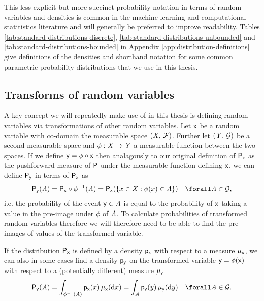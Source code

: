 This less explicit but more succinct probability notation in terms of random variables and densities is common in the machine learning and computational statitistics literature and will generally be preferred to improve readability. 
Tables \ref{tab:standard-distributions-discrete}, \ref{tab:standard-distributions-unbounded} and \ref{tab:standard-distributions-bounded} in Appendix \ref{app:distribution-definitions} give definitions of the densities and shorthand notation for some common parametric probability distributions that we use in this thesis.

\subsection{Transforms of random variables}\label{subsec:change-of-variables}

A key concept we will repeatedly make use of in this thesis is defining random variables via transformations of other random variables. Let $\mathsf{x}$ be a random variable with co-domain the measurable space $(\mathit{X},\,\mathcal{F})$. Further let $(\mathit{Y},\,\mathcal{G})$ be a second measurable space and $\phi : \mathit{X} \to \mathit{Y}$ a measurable function between the two spaces. If we define $\mathsf{y} = \phi \circ \mathsf{x}$ then analagously to our original definition of $\mathsf{P}_{\mathsf{x}}$ as the pushforward measure of $\mathsf{P}$ under the measurable function defining $\mathsf{x}$, we can define $\mathsf{P}_{\mathsf{y}}$ in terms of $\mathsf{P}_{\mathsf{x}}$ as
\begin{equation}\label{eq:change-of-variables-probability}
  \prob{\rvar{y}}(\set{A}) = 
  \prob{\rvar{x}} \circ \phi^{-1}(\set{A}) =
  \prob{\rvar{x}}\lpa \lbrace x \in \set{X} : \phi(x) \in \set{A} \rbrace \rpa
  \quad \forall \set{A} \in \sset{G},
\end{equation}
i.e. the probability of the event $\mathsf{y} \in \mathit{A}$ is equal to the probability of $\mathsf{x}$ taking a value in the pre-image under $\phi$ of $\mathit{A}$. To calculate probabilities of transformed random variables therefore we will therefore need to be able to find the pre-images of values of the transformed variable.

If the distribution $\mathsf{P}_{\mathsf{x}}$ is defined by a density $\mathsf{p}_{\mathsf{x}}$ with respect to a measure $\mu_{\mathsf{x}}$, we can also in some cases find a density $\mathsf{p}_{\mathsf{y}}$ on the transformed variable $\mathsf{y} = \phi(\mathsf{x})$ with respect to a (potentially different) measure $\mu_{\mathsf{y}}$
\begin{equation}\label{eq:change-of-variables-general}
  \prob{\rvar{y}}(\set{A}) =
  \int_{\phi^{-1}(\set{A})} \pden{\rvar{x}}(x) \,\mu_{\rvar{x}}(\dr x) = 
  \int_{\set{A}} \pden{\rvar{y}}(y) \,\mu_{\rvar{y}}(\dr y)
  \quad \forall \set{A} \in \sset{G}.
\end{equation}

